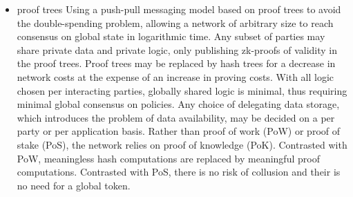 \begin{itemize}
    \item{proof trees}
    Using a push-pull messaging model based on proof trees to avoid the double-spending problem, allowing a network of arbitrary size to reach consensus on global state in logarithmic time.
    Any subset of parties may share private data and private logic, only publishing zk-proofs of validity in the proof trees.
    Proof trees may be replaced by hash trees for a decrease in network costs at the expense of an increase in proving costs.
    With all logic chosen per interacting parties, globally shared logic is minimal, thus requiring minimal global consensus on policies.
    Any choice of delegating data storage, which introduces the problem of data availability, may be decided on a per party or per application basis. 
    Rather than proof of work (PoW) or proof of stake (PoS), the network relies on proof of knowledge (PoK).
    Contrasted with PoW, meaningless hash computations are replaced by meaningful proof computations.
    Contrasted with PoS, there is no risk of collusion and their is no need for a global token.

\end{itemize}

